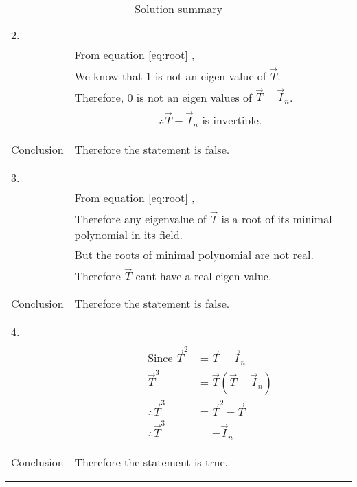 \documentclass[journal,12pt]{IEEEtran}
\begin{document}
\begin{longtable}{|l|l|}
2.&\\
& From equation \eqref{eq:root} ,\\
&We know that 1 is not an eigen value of $\vec{T}$.\\
&Therefore, 0 is not an eigen values of  $\vec{T}-\vec{I}_{n}$.\\
&\parbox{6cm}{\begin{align}
    \therefore\vec{T}-\vec{I}_{n}\mbox{ is invertible.}
\end{align}}\\
&\\
\hline
&\\
Conclusion&Therefore the statement is false.\\
&\\
\hline
\pagebreak
\hline
&\\
3.&\\
& From equation \eqref{eq:root} ,\\
&Therefore any eigenvalue of $\vec{T}$ is a root of its minimal polynomial in its field.\\
&But the roots of minimal polynomial are not real.\\
&Therefore $\vec{T}$ cant have a real eigen value.\\
&\\
\hline
&\\
Conclusion&Therefore the statement is false.\\
&\\
\hline
&\\
4.&\\
&\parbox{6cm}{\begin{align}
    \mbox{Since }\vec{T}^2&=\vec{T}-\vec{I}_{n}\\
    \vec{T}^3&=\vec{T}(\vec{T}-\vec{I}_{n})\\
    \therefore\vec{T}^3&=\vec{T}^2-\vec{T}\\
    \therefore \vec{T}^3&=-\vec{I}_{n}\label{eq:T_cube}
\end{align}}\\
&\\
\hline
&\\
Conclusion&Therefore the statement is true.\\
&\\
\hline
\caption{Solution summary}
\label{table:2}
\end{longtable}
\end{document}
